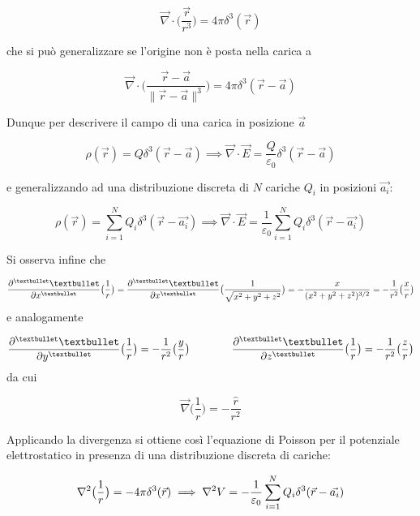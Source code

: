 \[\vec{\nabla} \cdot \big(\frac{\vec{r}}{r^3}\big) = 4 \pi \delta^3(\vec{r})\]

che si può generalizzare se l'origine non è posta nella carica a 

\[\vec{\nabla} \cdot \big(\frac{\vec{r} - \vec{a}}{\|\vec{r} - \vec{a}\|^3}\big) = 4 \pi \delta^3(\vec{r} - \vec{a})\]

Dunque per descrivere il campo di una carica in posizione $\vec{a}$

\[\rho(\vec{r}) = Q \delta^3(\vec{r} - \vec{a}) \implies \vec{\nabla} \cdot \vec{E} = \frac{Q}{\varepsilon_0} \delta^3(\vec{r} - \vec{a})\]

e generalizzando ad una distribuzione discreta di $N$ cariche $Q_i$ in posizioni $\vec{a_i}$:

\[\rho(\vec{r}) = \sum\limits_{i=1}^{N} Q_i \delta^3(\vec{r} - \vec{a_i}) \implies \vec{\nabla} \cdot \vec{E} = \frac{1}{\varepsilon_0} \sum\limits_{i=1}^{N} Q_i \delta^3(\vec{r} - \vec{a_i})\]

Si osserva infine che

\[\pdv[•]{•}{x} \big(\frac{1}{r}\big) = \pdv[•]{•}{x} \big(\frac{1}{\sqrt{x^2 + y^2 + z^2}}\big) = - \frac{x}{(x^2 + y^2 + z^2)^{3/2}} = - \frac{1}{r^2} \big(\frac{x}{r}\big)\]
e analogamente

\[\pdv[•]{•}{y} \big(\frac{1}{r}\big) = - \frac{1}{r^2} \big(\frac{y}{r}\big) \qquad \qquad \pdv[•]{•}{z} \big(\frac{1}{r}\big) = - \frac{1}{r^2} \big(\frac{z}{r}\big)\]
da cui

\[\vec{\nabla} \big(\frac{1}{r}\big) = - \frac{\hat{r}}{r^2}\]

Applicando la divergenza si ottiene così l'equazione di Poisson per il potenziale elettrostatico in presenza di una distribuzione discreta di cariche:

\[\laplacian \big(\frac{1}{r}\big) = - 4 \pi \delta^3(\vec{r}) \implies \laplacian V = - \frac{1}{\varepsilon_0} \sum\limits_{i=1}^{N} Q_i \delta^3(\vec{r} - \vec{a_i})\]










